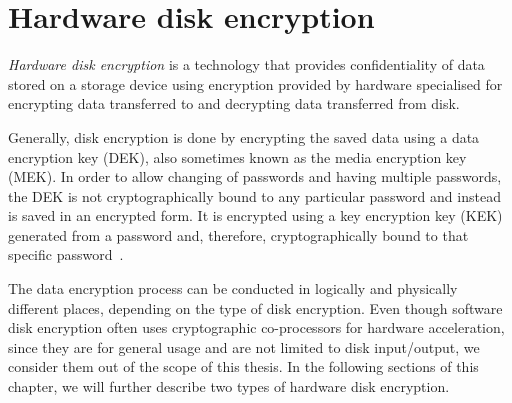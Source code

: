 
\chapter{Hardware disk encryption}
\label{chapter_hardware_disk_encryption}




\emph{Hardware disk encryption} is a technology that provides confidentiality of data stored on a storage device using encryption provided by hardware specialised for encrypting data transferred to and decrypting data transferred from disk.

Generally, disk encryption is done by encrypting the saved data using a data encryption key (DEK), also sometimes known as the media encryption key (MEK). In order to allow changing of passwords and having multiple passwords, the DEK is not cryptographically bound to any particular password and instead is saved in an encrypted form. It is encrypted using a key encryption key (KEK) generated from a password and, therefore, cryptographically bound to that specific password~\cite{pp_for_fde}.


The data encryption process can be conducted in logically and physically different places, depending on the type of disk encryption. 
Even though software disk encryption often uses cryptographic co-processors for hardware acceleration, since they are for general usage and are not limited to disk input/output, we consider them out of the scope of this thesis.
In the following sections of this chapter, we will further describe two types of hardware disk encryption.





